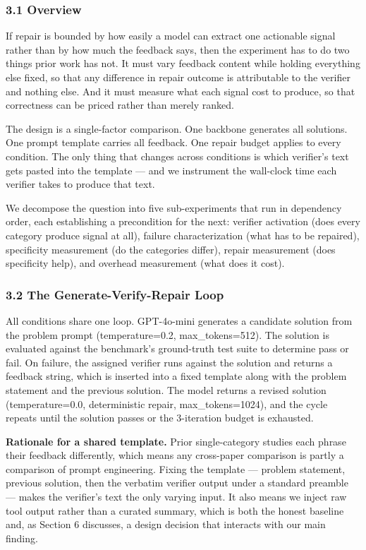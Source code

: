 
\subsubsection{3.1 Overview}

If repair is bounded by how easily a model can extract one actionable signal rather than by how much the feedback says, then the experiment has to do two things prior work has not. It must vary feedback content while holding everything else fixed, so that any difference in repair outcome is attributable to the verifier and nothing else. And it must measure what each signal cost to produce, so that correctness can be priced rather than merely ranked.

The design is a single-factor comparison. One backbone generates all solutions. One prompt template carries all feedback. One repair budget applies to every condition. The only thing that changes across conditions is which verifier's text gets pasted into the template --- and we instrument the wall-clock time each verifier takes to produce that text.

We decompose the question into five sub-experiments that run in dependency order, each establishing a precondition for the next: verifier activation (does every category produce signal at all), failure characterization (what has to be repaired), specificity measurement (do the categories differ), repair measurement (does specificity help), and overhead measurement (what does it cost).

\subsubsection{3.2 The Generate-Verify-Repair Loop}

All conditions share one loop. GPT-4o-mini generates a candidate solution from the problem prompt (temperature=0.2, max\_tokens=512). The solution is evaluated against the benchmark's ground-truth test suite to determine pass or fail. On failure, the assigned verifier runs against the solution and returns a feedback string, which is inserted into a fixed template along with the problem statement and the previous solution. The model returns a revised solution (temperature=0.0, deterministic repair, max\_tokens=1024), and the cycle repeats until the solution passes or the 3-iteration budget is exhausted.

\textbf{Rationale for a shared template.} Prior single-category studies each phrase their feedback differently, which means any cross-paper comparison is partly a comparison of prompt engineering. Fixing the template --- problem statement, previous solution, then the verbatim verifier output under a standard preamble --- makes the verifier's text the only varying input. It also means we inject raw tool output rather than a curated summary, which is both the honest baseline and, as Section 6 discusses, a design decision that interacts with our main finding.

